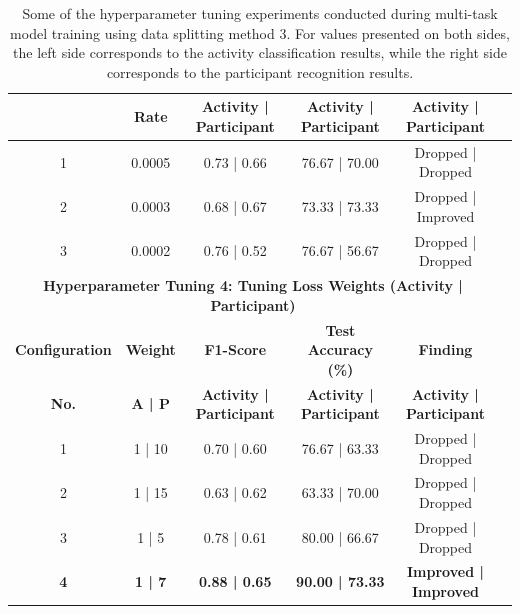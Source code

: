 \documentclass{l4proj}
\begin{document}
\begin{appendices}
\begin{table}[h]
\begin{tabular}{cccccc}
        & \textbf{Rate} & \textbf{Activity | Participant} & \textbf{Activity | Participant} & \textbf{Activity | Participant}\\
        \midrule
        1 & 0.0005 & 0.73 | 0.66 & 76.67 | 70.00 & Dropped | Dropped \\
        2 & 0.0003 & 0.68 | 0.67 & 73.33 | 73.33 & Dropped | Improved \\
        3 & 0.0002 & 0.76 | 0.52 & 76.67 | 56.67 & Dropped | Dropped \\
        \midrule
        \multicolumn{5}{c}{\textbf{Hyperparameter Tuning 4: Tuning Loss Weights (Activity | Participant)}} \\
        \midrule
        \textbf{Configuration} & \textbf{Weight} & \textbf{F1-Score} & \textbf{Test Accuracy (\%)} & \textbf{Finding} \\ \textbf{No.}
        & \textbf{A | P} & \textbf{Activity | Participant} & \textbf{Activity | Participant} & \textbf{Activity | Participant}\\
        \midrule
        1 & 1 | 10 & 0.70 | 0.60 & 76.67 | 63.33 & Dropped | Dropped \\
        2 & 1 | 15 & 0.63 | 0.62 & 63.33 | 70.00 & Dropped | Dropped \\
        3 & 1 | 5 & 0.78 | 0.61 & 80.00 | 66.67 & Dropped | Dropped
        \\
        \textbf{4} & \textbf{1 | 7} & \textbf{0.88 | 0.65} & \textbf{90.00 | 73.33} & \textbf{Improved | Improved}\\
        \bottomrule
    \end{tabular}
    \caption{Some of the hyperparameter tuning experiments conducted during multi-task model training using data splitting method 3. For values presented on both sides, the left side corresponds to the activity classification results, while the right side corresponds to the participant recognition results.}
    \label{tab:multitask-hyperparameter-tuning}
\end{table}

\newpage


\end{appendices}
\end{document}
